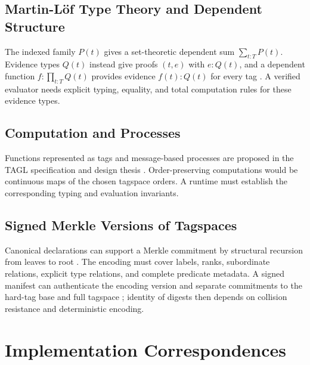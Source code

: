 \documentclass{article}
\begin{document}
\subsection{Martin-L\"{o}f Type Theory and Dependent Structure}\label{sec:mltt}
The indexed family $P(t)$ gives a set-theoretic dependent sum
$\sum_{t:T}P(t)$. Evidence types $Q(t)$ instead give proofs $(t,e)$ with
$e:Q(t)$, and a dependent function $f:\prod_{t:T}Q(t)$ provides evidence
$f(t):Q(t)$ for every tag \cite{mltt}. A verified evaluator needs explicit
typing, equality, and total computation rules for these evidence types.

\subsection{Computation and Processes}
Functions represented as tags and message-based processes are proposed in the
TAGL specification and design thesis \cite{spec,thesis}. Order-preserving
computations would be continuous maps of the chosen tagspace orders. A runtime
must establish the corresponding typing and evaluation invariants.

\subsection{Signed Merkle Versions of Tagspaces}\label{sec:merkle}
Canonical declarations can support a Merkle commitment by structural recursion
from leaves to root \cite{merkle}. The encoding must cover labels, ranks,
subordinate relations, explicit type relations, and complete predicate metadata.
A signed manifest can authenticate the encoding version and separate commitments
to the hard-tag base and full tagspace \cite{signatures}; identity of digests
then depends on collision resistance and deterministic encoding.

\appendix
\section{Implementation Correspondences}
\end{document}
